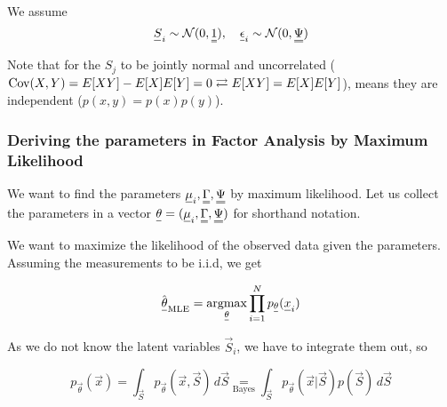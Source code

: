 
We assume
\begin{equation}
    \vec{S}_i \sim \mathcal{N}(0, \mat{1}), \quad \vec{\epsilon}_i \sim \mathcal{N}(0, \mat{\Psi})
\end{equation}

Note that for the $S_j$ to be jointly normal and uncorrelated ($\operatorname{Cov}(X,Y) = E[XY] - E[X] E[Y] = 0 \rightleftarrows E[XY] = E[X]E[Y]$), 
means they are independent ($p(x,y) = p(x) p(y)$).




\subsubsection{Deriving the parameters in Factor Analysis by Maximum Likelihood}
We want to find the parameters $\vec{\mu}_i, \mat{\Gamma}, \mat{\Psi}$ by maximum likelihood.
Let us collect the parameters in a vector $\vec{\theta} = (\vec{\mu}_i, \mat{\Gamma}, \mat{\Psi})$ for 
shorthand notation.

We want to maximize the likelihood of the observed data given the parameters. Assuming the measurements to be i.i.d, we get

\begin{equation}
    \hat{\vec{\theta}}_{\text{MLE}} = \argmax_{\vec{\theta}} \prod_{i=1}^{N} p_{\vec{\theta}}(\vec{x}_i)
\end{equation}

As we do not know the latent variables $\vec{S}_i$, we have to integrate them out, so

\begin{equation}
    p_\vec{\theta}(\vec{x}) = \int_\vec{S} p_\vec{\theta} (\vec{x}, \vec{S}) \, d\vec{S} \underset{\text{Bayes}}{=} \int_\vec{S} p_\vec{\theta} (\vec{x} | \vec{S}) p(\vec{S}) \, d\vec{S}
\end{equation}

